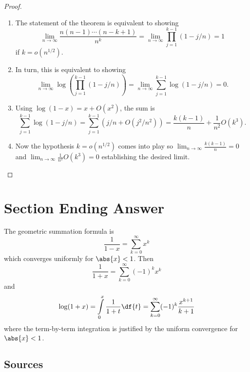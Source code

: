 \documentclass[12pt]{article}
\begin{document}
\begin{proof}
    \begin{enumerate}
        \item
            The statement of the theorem is equivalent to showing
            \[
                \lim_{n \to \infty}\frac{n(n-1) \cdots (n-k+1)}{n^k} =
                \lim_{n \to \infty} \prod_{j=1}^{k-1}\left( 1 - j/n
                \right) = 1
            \] if \( k = o(n^{1/2}) \).
        \item
            In turn, this is equivalent to showing
            \[
                \lim_{n \to \infty} \log \left( \prod_{j=1}^{k-1} \left(
                1 - j/n \right) \right) = \lim_{n \to \infty} \sum_{j=1}^
                {k-1} \log \left( 1 - j/n \right) = 0.
            \]
        \item
            Using \( \log(1-x) = x + O(x^2) \), the sum is
            \[
                \sum_{j=1}^{k-1} \log \left( 1 - j/n \right) = \sum_{j=1}^
                {k-1} \left( j/n + O(j^2/n^2) \right) = \frac{k(k-1)}{n}
                + \frac{1}{n^2} O(k^3).
            \]
        \item
            Now the hypothesis \( k = o(n^{1/2}) \) comes into play so \(
            \lim_{n \to \infty }\frac{k(k-1)}{n} = 0 \) and \( \lim_{n
            \to \infty } \frac{1}{n^2} O(k^3) = 0 \) establishing the
            desired limit.
    \end{enumerate}
\end{proof}

\section*{Section Ending Answer}

The geometric summation formula is
\[
    \frac{1}{1-x} = \sum\limits_{k=0}^{\infty} x^k
\] which converges uniformly for \( \abs{x} < 1 \).  Then
\[
    \frac{1}{1+x} = \sum\limits_{k=0}^{\infty} (-1)^{k}x^k
\] and
\[
    \log(1 + x) = \int\limits_{0}^{x} \frac{1}{1 + t} \df{t} = \sum\limits_
    {k=0}^{\infty} (-1)^k \frac{x^{k+1}}{k+1}
\] where the term-by-term integration is justified by the uniform
convergence for \( \abs{x} < 1 \).

\subsection*{Sources}
\end{document}
